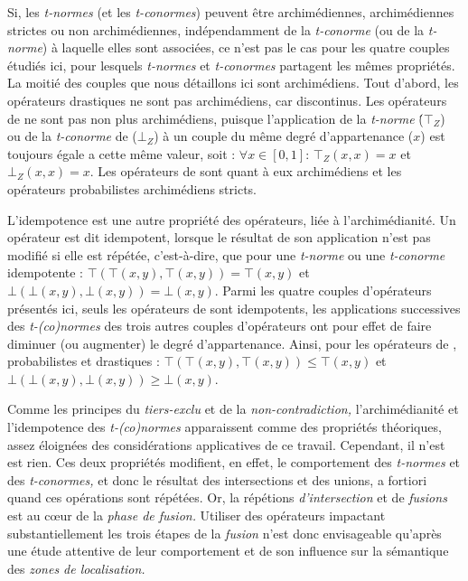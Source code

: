 Si, les \emph{t-normes} (et les \emph{t-conormes}) peuvent être
archimédiennes, archimédiennes strictes ou non archimédiennes,
indépendamment de la \emph{t-conorme} (ou de la \emph{t-norme}) à
laquelle elles sont associées, ce n'est pas le cas pour les quatre
couples étudiés ici, pour lesquels \emph{t-normes} et
\emph{t-conormes} partagent les mêmes propriétés. La moitié des
couples que nous détaillons ici sont archimédiens. Tout d'abord, les
opérateurs drastiques ne sont pas archimédiens, car discontinus. Les
opérateurs de \textcite{Zadeh1965} ne sont pas non plus archimédiens,
puisque l’application de la \emph{t-norme} (́\(⊤_Z\)) ou de la
\emph{t-conorme} de  (\(⊥_Z\)) à un couple du même degré
d'appartenance (\(x\)) est toujours égale a cette même valeur, soit :
\(∀ x ∈ [0,1]\): \(⊤_Z(x,x) = x\) et \(⊥_Z(x,x) = x\).
%
Les opérateurs de  sont quant à eux archimédiens et
les opérateurs probabilistes archimédiens stricts.

L’idempotence est une autre propriété des opérateurs, liée à
l'archimédianité. Un opérateur est dit idempotent, lorsque le résultat
de son application n'est pas modifié si elle est répétée,
c'est-à-dire, que pour une \emph{t-norme} ou une \emph{t-conorme}
idempotente : \(⊤(⊤(x,y), ⊤(x,y)) = ⊤(x,y)\) et
\(⊥(⊥(x,y),⊥(x,y)) = ⊥(x,y)\). Parmi les quatre couples d'opérateurs
présentés ici, seuls les opérateurs de  sont idempotents,
les applications successives des \emph{t-(co)normes} des trois autres
couples d'opérateurs ont pour effet de faire diminuer (ou augmenter)
le degré d'appartenance. Ainsi, pour les opérateurs de
, probabilistes et drastiques :
\(⊤(⊤(x,y), ⊤(x,y)) ≤ ⊤(x,y)\) et \(⊥(⊥(x,y),⊥(x,y)) ≥ ⊥(x,y)\).

Comme les principes du \emph{tiers-exclu} et de la
\emph{non-contradiction,} l'archimédianité et l'idempotence des
\emph{t-(co)normes} apparaissent comme des propriétés théoriques,
assez éloignées des considérations applicatives de ce
travail. Cependant, il n'est est rien. Ces deux propriétés modifient,
en effet, le comportement des \emph{t-normes} et des
\emph{t-conormes,} et donc le résultat des intersections et des
unions, a fortiori quand ces opérations sont répétées. Or, la
répétions \emph{d'intersection} et de \emph{fusions} est au cœur de la
\emph{phase de fusion.} Utiliser des opérateurs impactant
substantiellement les trois étapes de la \emph{fusion} n'est donc
envisageable qu'après une étude attentive de leur comportement et de
son influence sur la sémantique des \emph{zones de localisation.}

